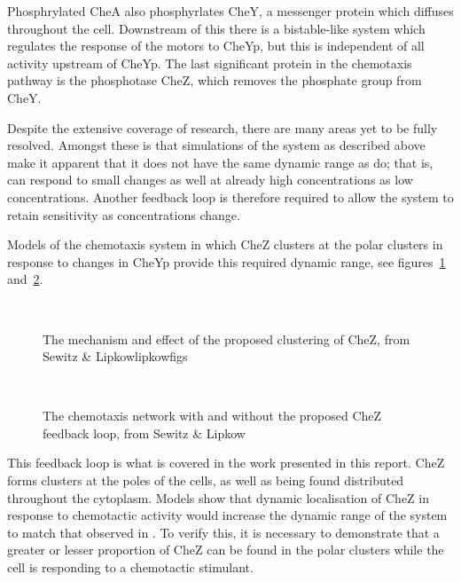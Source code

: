 \documentclass[../main.tex]{subfiles}
\begin{document}
Phosphrylated CheA also phosphyrlates CheY, a messenger protein which diffuses throughout the cell. Downstream of this there is a bistable-like system which regulates the response of the motors to CheYp, but this is independent of all activity upstream of CheYp. The last significant protein in the \ecoli chemotaxis pathway is the phosphotase CheZ, which removes the phosphate group from CheY.

Despite the extensive coverage of research, there are many areas yet to be fully resolved. Amongst these is that simulations of the system as described above make it apparent that it does not have the same dynamic range as \ecoli do; that is, \ecoli can respond to small changes as well at already high concentrations as low concentrations. Another feedback loop is therefore required to allow the system to retain sensitivity as concentrations change.

Models of the chemotaxis system in which CheZ clusters at the polar clusters in response to changes in CheYp provide this required dynamic range, see figures~\ref{fig:intro:chemo} and~\ref{fig:intro:netwok}.

\begin{figure}[h!]
\begin{center}
\label{fig:intro:chemo:mech}\\
\caption{The mechanism and effect of the proposed clustering of CheZ, from Sewitz \& Lipkow{lipkowfigs}}
\label{fig:intro:chemo}
\end{center}
\end{figure}

\begin{figure}[h!]
\begin{center}
\\
\caption{The chemotaxis network with and without the proposed CheZ feedback loop, from Sewitz \& Lipkow\cite{lipkowfigs}}
\label{fig:intro:netwok}
\end{center}
\end{figure}

This feedback loop is what is covered in the work presented in this report. CheZ forms clusters at the poles of the cells, as well as being found distributed throughout the cytoplasm. Models show that dynamic localisation of CheZ in response to chemotactic activity would increase the dynamic range of the system to match that observed in \ecoli\cite{lipkow06}. To verify this, it is necessary to demonstrate that a greater or lesser proportion of CheZ can be found in the polar clusters while the cell is responding to a chemotactic stimulant.
\end{document}
